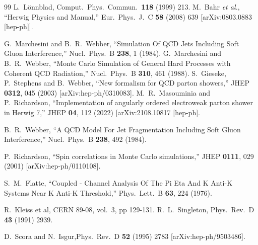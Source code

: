 \documentclass{article}
\begin{document}
\begin{thebibliography}{99}
 L.~L\"onnblad, Comput.~Phys.~Commun.\ {\bf 118} (1999) 213.
  M.~Bahr {\it et al.},
  ``Herwig Physics and Manual,''
  Eur.\ Phys.\ J.\  C {\bf 58} (2008) 639
  [arXiv:0803.0883 [hep-ph]].

  G.~Marchesini and B.~R.~Webber,
  ``Simulation Of QCD Jets Including Soft Gluon Interference,''
  Nucl.\ Phys.\  B {\bf 238}, 1 (1984).
  G.~Marchesini and B.~R.~Webber,
   ``Monte Carlo Simulation of General Hard Processes with Coherent QCD
  Radiation,''
  Nucl.\ Phys.\  B {\bf 310}, 461 (1988).
  S.~Gieseke, P.~Stephens and B.~Webber,
  ``New formalism for QCD parton showers,''
  JHEP {\bf 0312}, 045 (2003)
  [arXiv:hep-ph/0310083].
  M.~R.~Masouminia and P.~Richardson,
  ``Implementation of angularly ordered electroweak parton shower in Herwig 7,''
  JHEP {\bf 04}, 112 (2022)
  [arXiv:2108.10817 [hep-ph].

  B.~R.~Webber,
  ``A QCD Model For Jet Fragmentation Including Soft Gluon Interference,''
  Nucl.\ Phys.\  B {\bf 238}, 492 (1984).

  P.~Richardson,
  ``Spin correlations in Monte Carlo simulations,''
  JHEP {\bf 0111}, 029 (2001)
  [arXiv:hep-ph/0110108].

  S.~M.~Flatte,
   ``Coupled - Channel Analysis Of The Pi Eta And K Anti-K Systems Near K Anti-K
  Threshold,''
  Phys.\ Lett.\  B {\bf 63}, 224 (1976).

 R.~Kleiss et al, CERN 89-08, vol.~3, pp 129-131.
  R.~L.~Singleton,
  Phys.\ Rev.\  D {\bf 43} (1991) 2939.

 D.~Scora and N.~Isgur,Phys.\ Rev.\  D {\bf 52} (1995) 2783 [arXiv:hep-ph/9503486].


\end{thebibliography}
\end{document}
